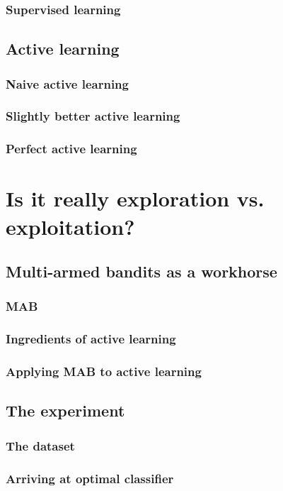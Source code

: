 \documentclass{beamer}
\begin{document}
  \begin{frame}
    \frametitle{Supervised learning}
  \end{frame}

\subsection{Active learning}
  \begin{frame}
    \frametitle{Naive active learning}
  \end{frame}

  \begin{frame}
    \frametitle{Slightly better active learning}
  \end{frame}

  \begin{frame}
    \frametitle{Perfect active learning}
  \end{frame}


\section{Is it really exploration vs. exploitation?} 
\subsection{Multi-armed bandits as a workhorse}
  \begin{frame}
  \frametitle{MAB}
  \end{frame}

  \begin{frame}
  \frametitle{Ingredients of active learning}
  \end{frame}

  \begin{frame}
  \frametitle{Applying MAB to active learning}
  \end{frame}
\subsection{The experiment}
  \begin{frame}
  \frametitle{The dataset}
  \end{frame}
  \begin{frame}
  \frametitle{Arriving at optimal classifier}
  \end{frame}
\end{document}
